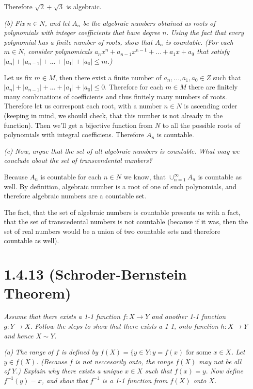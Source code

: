 \documentclass[11pt,oneside,titlepage]{book}
\begin{document}
Therefore $\sqrt{2} + \sqrt{3}$ is algebraic.

\textit{(b) Fix $n \in N$, and let $A_n$ be the algebraic numbers obtained as roots of
  polynomials with integer coefficients that have degree $n$. Using the fact that
  every polynomial has a finite number of roots, show that $A_n$ is countable. (For
  each $m \in N$, consider polynomicals $a_n x^n + a_{n - 1} x^{n - 1} + ... +
  a_1 x + a_0$ that satisfy $|a_n| + |a_{n - 1}| + ... + |a_1| + |a_0| \leq m$.)}

Let us fix $m \in M$, then there exist a finite number of $a_n, ..., a_1, a_0 \in Z$ such that
$|a_n| + |a_{n - 1}| + ... + |a_1| + |a_0| \leq 0$. Therefore for each $m \in M$ there
are finitely many combinations of coefficients and thus finitely many numbers of roots.
Therefore let us correspont each root, with a number $n \in N$ is ascending order
(keeping in mind, we should check, that this number is not already in the function). Then
we'll get a bijective  function from $N$ to all the possible roots of polynomials
with integral coefficiens. Therefore $A_n$ is countable.

\textit{(c) Now, argue that the set of all algebraic numbers is countable. What may we
  conclude about the set of transcendental numbers?}

Because $A_n$ is countable for each $n \in N$ we know, that
$\cup^{\infty}_{n = 1}A_n$ is countable as well. By definition, algebraic number
is a root of one of such polynomials, and therefore algebraic numbers are a countable
set.

The fact, that the set of algebraic numbers is countable presents us with a fact, that
the set of transcedental numbers is not countable (because if it was, then the set
of real numbers would be a union of two countable sets and therefore countable as
well).

\section*{1.4.13 (Schroder-Bernstein Theorem)}
\textit{Assume that there exists a 1-1 function $f: X \to Y$ and another 1-1 function
  $g: Y \to X$. Follow the steps to show that there exists a 1-1, onto function $h: X \to Y$
  and hence $X \sim Y$.}

\textit{(a) The range of $f$ is defined by $f(X) = \{y \in Y: y = f(x) \text{ for some }
  x \in X$. Let $y \in f(X)$. (Because $f$ is not neccesarily onto, the range $f(X)$
  may not be all of $Y$.) Explain why there exists a unique $x \in X$ such that $f(x) = y$.
  Now define $f^{-1}(y) = x$, and show that $f^{-1}$ is a 1-1 function from $f(X)$ onto $X$.}
\end{document}
